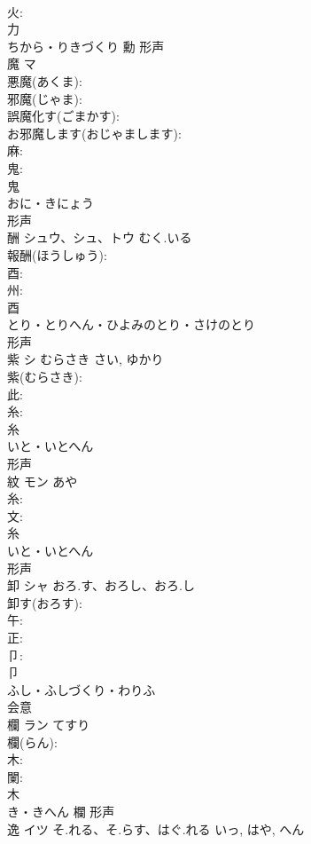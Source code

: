 \documentclass[8pt]{extreport}
\begin{document}
\begin{CJK}{UTF8}{min}
\\	火: 
\\	力	
\\	ちから・りきづくり	勳	形声 
\\	魔	マ			
\\	悪魔(あくま): 
\\	邪魔(じゃま): 
\\	誤魔化す(ごまかす): 
\\	お邪魔します(おじゃまします): 
\\	麻: 
\\	鬼: 
\\	鬼	
\\	おに・きにょう	
\\	形声 
\\	酬	シュウ、シュ、トウ	むく.いる		
\\	報酬(ほうしゅう): 
\\	酉: 
\\	州: 
\\	酉	
\\	とり・とりへん・ひよみのとり・さけのとり	
\\	形声 
\\	紫	シ	むらさき	さい, ゆかり	
\\	紫(むらさき): 
\\	此: 
\\	糸: 
\\	糸	
\\	いと・いとへん	
\\	形声 
\\	紋	モン		あや	
\\	糸: 
\\	文: 
\\	糸	
\\	いと・いとへん	
\\	形声 
\\	卸	シャ	おろ.す、おろし、おろ.し		
\\	卸す(おろす): 
\\	午: 
\\	正: 
\\	卩: 
\\	卩	
\\	ふし・ふしづくり・わりふ	
\\	会意 
\\	欄	ラン	てすり		
\\	欄(らん): 
\\	木: 
\\	闌: 
\\	木	
\\	き・きへん	欄	形声 
\\	逸	イツ	そ.れる、そ.らす、はぐ.れる	いっ, はや, へん	

\end{CJK}
\end{document}
